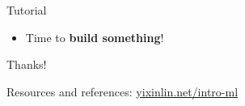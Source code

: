 \documentclass{beamer}
\begin{document}
\begin{frame}{Tutorial}
\begin{itemize}
    \item Time to \textbf{build something}!
\end{itemize}

\end{frame}

\begin{frame}
\Huge{\centerline{Thanks!}}

\Large{\centerline{Resources and references: \href{http://yixinlin.net/intro-ml}{yixinlin.net/intro-ml}}}

\end{frame}

\end{document}
